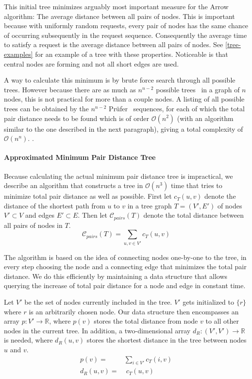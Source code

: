 \documentclass[a4paper, oneside]{discothesis}
\begin{document}
This initial tree minimizes arguably most important measure for the Arrow algorithm: The average distance between all pairs of nodes. This is important because with uniformly random requests, every pair of nodes has the same chance of occurring subsequently in the request sequence. Consequently the average time to satisfy a request is the average distance between all pairs of nodes. See \autoref{tree-examples} for an example of a tree with these properties. Noticeable is that central nodes are forming and not all short edges are used.

A way to calculate this minimum is by brute force search through all possible trees. However because there are as much as $n^{n-2}$ possible trees~\cite{Borchardt} in a graph of $n$ nodes, this is not practical for more than a couple nodes. A listing of all possible trees can be obtained by the $n^{n-2}$ Prüfer~\cite{Prufer} sequences, for each of which the total pair distance needs to be found which is of order $\mathcal{O}(n^2)$ (with an algorithm similar to the one described in the next paragraph), giving a total complexity of $\mathcal{O}(n^n)$. .


\paragraph{Approximated Minimum Pair Distance Tree}\label{tree:ampd}

Because calculating the actual minimum pair distance tree is impractical, we describe an algorithm that constructs a tree in $\mathcal{O}(n^3)$ time that tries to minimize total pair distance as well as possible. First let $c_T(u, v)$ denote the distance of the shortest path from $u$ to $v$ in a tree graph $T=(V',E')$ of nodes $V'\subset V$ and edges $E'\subset E$. Then let $\mathcal{C}_{pairs}(T)$ denote the total distance between all pairs of nodes in $T$.
\begin{equation}
\mathcal{C}_{pairs}(T) = \sum_{u,v\in V'}c_T(u,v)
\end{equation}

The algorithm is based on the idea of connecting nodes one-by-one to the tree, in every step choosing the node and a connecting edge that minimizes the total pair distance. We do this efficiently by maintaining a data structure that allows querying the increase of total pair distance for a node and edge in constant time.

Let $V'$ be the set of nodes currently included in the tree. $V'$ gets initialized to $\{r\}$ where $r$ is an arbitrarily chosen node. Our data structure then encompasses an array $p:V'\to\mathbb{R}$, where $p(v)$ stores the total distance from node $v$ to all other nodes in the current tree. In addition, a two-dimensional array $d_R:(V',V')\to\mathbb{R}$ is needed, where $d_R(u,v)$ stores the shortest distance in the tree between nodes $u$ and $v$.
\begin{equation}
\begin{split}
p(v)=&\sum_{i\in V'}c_T(i,v) \\
d_R(u,v)=&\;c_T(u,v)\\
\end{split}
\end{equation}
\end{document}
